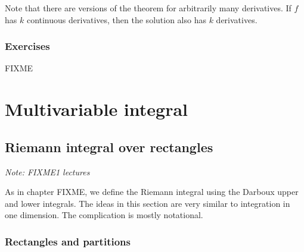 \documentclass[12pt]{book}
\newcommand{\sectionnotes}[1]{\noindent \emph{Note: #1} \medskip \par}
\theoremstyle{plain}
\theoremstyle{remark}
\theoremstyle{definition}
\theoremstyle{exercise}
\theoremstyle{example}
\begin{document}
Note that there are versions of the theorem for arbitrarily many derivatives.
If $f$ has $k$ continuous derivatives, then the solution also has $k$
derivatives.


\subsection{Exercises}

FIXME



\chapter{Multivariable integral} \label{mi:chapter}



\section{Riemann integral over rectangles}
\label{sec:rirect}

\sectionnotes{FIXME1 lectures}

As in chapter FIXME, we define the Riemann integral using the Darboux
upper and lower integrals.  The ideas in this section are very similar to
integration in one dimension.  The complication is mostly notational.

\subsection{Rectangles and partitions}
\end{document}
